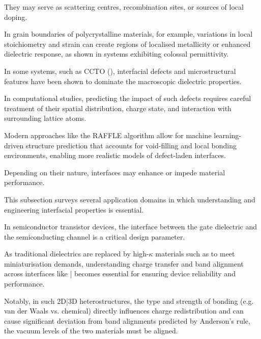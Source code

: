 They may serve as scattering centres, recombination sites, or sources of local doping\cite{Leitherer2023-ew}.

In grain boundaries of polycrystalline materials, for example, variations in local stoichiometry and strain can create
regions of localised metallicity or enhanced dielectric response, as shown in systems exhibiting colossal permittivity\cite{}.

In some systems, such as CCTO (), interfacial defects and microstructural features have been shown to
dominate the macroscopic dielectric properties\cite{RAFFLE}.

\label{para:defect_ml_prediction} %

In computational studies, predicting the impact of such defects requires careful treatment of their spatial distribution,
charge state, and interaction with surrounding lattice atoms\cite{}.

Modern approaches like the RAFFLE algorithm allow for machine learning-driven structure prediction that accounts for
void-filling and local bonding environments, enabling more realistic models of defect-laden interfaces\cite{RAFFLE}.

\label{para:interface_applications} %

Depending on their nature, interfaces may enhance or impede material performance\cite{Leitherer2023-ew, Butler2019-ws}.

This subsection surveys several application domains in which understanding and engineering interfacial properties is
essential.

\label{para:gate_dielectric_interface} %

In semiconductor transistor devices, the interface between the gate dielectric and the semiconducting channel is a
critical design parameter\cite{Schusteritsch2015-lw, Wild2025-jy}.


As traditional  dielectrics are replaced by high-$\kappa$ materials such as  to meet miniaturisation
demands, understanding charge transfer and band alignment across interfaces like |  becomes essential
for ensuring device reliability and performance\cite{}.

Notably, in such 2D|3D heterostructures, the type and strength of bonding (e.g. van der Waals vs. chemical) directly
influences charge redistribution and can cause significant deviation from band alignments predicted by Anderson's rule,
the vacuum levels of the two materials must be aligned\cite{Davies2021-zh}.

